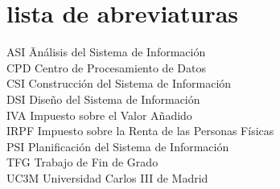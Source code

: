 \newpage %
\thispagestyle{empty}
\mbox{}

\chapter*{lista de abreviaturas}
\begin{tabbing}  %
	ASI \quad\quad\= Análisis del Sistema de Información \\
	CPD \>  Centro de Procesamiento de Datos \\
	CSI \> Construcción del Sistema de Información \\
	DSI \> Diseño del Sistema de Información \\
	IVA \>  Impuesto sobre el Valor Añadido \\
	IRPF  \>   Impuesto sobre la Renta de las Personas Físicas \\
	PSI \> Planificación del Sistema de Información \\
	TFG \>  Trabajo de Fin de Grado \\
	UC3M  \>  Universidad Carlos III de Madrid
\end{tabbing}